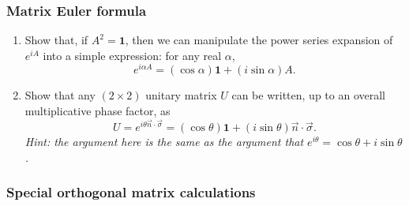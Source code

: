 \documentclass[fleqn]{article}
\begin{document}
\hypertarget{matrix-euler-formula}{%
\subsubsection{Matrix Euler formula}\label{matrix-euler-formula}}

\begin{enumerate}
\def\labelenumi{\arabic{enumi}.}
\item
  Show that, if \(A^2=\mathbf{1}\), then we can manipulate the power series expansion of \(e^{iA}\) into a simple expression: for any real \(\alpha\),
  \[
     e^{i\alpha A}
     = (\cos\alpha)\mathbf{1}+ (i\sin\alpha)A.
   \]
\item
  Show that any \((2\times 2)\) unitary matrix \(U\) can be written, up to an overall multiplicative phase factor, as
  \[
     U
     = e^{i \theta \vec{n}\cdot\vec{\sigma}}
     = (\cos\theta)\mathbf{1}+ (i\sin\theta)\vec{n}\cdot\vec{\sigma}.
   \]
  \emph{Hint: the argument here is the same as the argument that \(e^{i\theta}=\cos\theta +i\sin\theta\).}
\end{enumerate}

\hypertarget{special-orthogonal-matrix-calculations}{%
\subsubsection{Special orthogonal matrix calculations}\label{special-orthogonal-matrix-calculations}}
\end{document}
